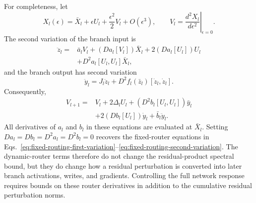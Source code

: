 \documentclass{article}
\begin{document}
For completeness, let
\begin{equation}
 X_l(\epsilon)=\bar X_l+\epsilon U_l+\frac{\epsilon^2}{2}V_l+O(\epsilon^3),
 \mspace{36mu}
 V_l=\left.\frac{d^2X_l}{d\epsilon^2}\right|_{\epsilon=0}.
 \label{eq:dynamic-residual-taylor}
\end{equation}
The second variation of the branch input is
\begin{equation}
 \begin{aligned}
 \ddot z_l={}&\bar a_lV_l+(Da_l[V_l])\bar X_l
 +2(Da_l[U_l])U_l\\
 &+D^2a_l[U_l,U_l]\bar X_l,
 \end{aligned}
 \label{eq:dynamic-residual-second-read}
\end{equation}
and the branch output has second variation
\begin{equation}
 \ddot y_l=J_l\ddot z_l+D^2f_l(\bar z_l)[\dot z_l,\dot z_l].
 \label{eq:dynamic-residual-second-branch}
\end{equation}
Consequently,
\begin{equation}
 \begin{aligned}
 V_{l+1}={}&V_l+2\Delta_lU_l
 +(D^2b_l[U_l,U_l])\bar y_l\\
 &+2(Db_l[U_l])\dot y_l+\bar b_l\ddot y_l.
 \end{aligned}
 \label{eq:dynamic-residual-second-variation}
\end{equation}
All derivatives of $a_l$ and $b_l$ in these equations are evaluated at
$\bar X_l$. Setting $Da_l=Db_l=D^2a_l=D^2b_l=0$ recovers the fixed-router
equations in Eqs.~\ref{eq:fixed-routing-first-variation}--\ref{eq:fixed-routing-second-variation}.
The dynamic-router terms therefore do not change the residual-product spectral
bound, but they do change how a residual perturbation is converted into later
branch activations, writes, and gradients. Controlling the full network response
requires bounds on these router derivatives in addition to the cumulative
residual perturbation norms.
\end{document}
